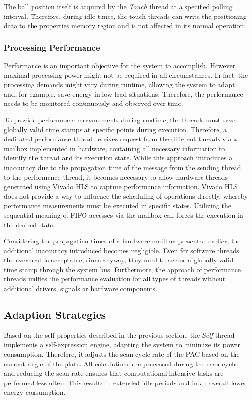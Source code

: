 The ball position itself is acquired by the \emph{Touch} thread at a specified
polling interval. Therefore, during idle times, the touch threads can write
the positioning data to the properties memory region and is not affected in
its normal operation.

\subsubsection{Processing Performance}
\label{sssec:processing}
Performance is an important objective for the system to accomplish. However,
maximal processing power might not be required in all circumstances. In fact,
the processing demands might vary during runtime, allowing the system to adapt
and, for example, save energy in low load situations. Therefore, the
performance needs to be monitored continuously and observed over time.

To provide performance measurements during runtime, the threads must save
globally valid time stamps at specific points during execution. Therefore, a
dedicated performance thread receives request from the different threads via a
mailbox implemented in hardware, containing all necessary information to
identify the thread and its execution state. While this approach introduces a
inaccuracy due to the propagation time of the message from the sending thread
to the performance thread, it becomes necessary to allow hardware threads
generated using Vivado HLS to capture performance information. Vivado HLS does
not provide a way to influence the scheduling of operations directly, whereby
performance measurements must be executed in specific states. Utilizing the
sequential meaning of \ac{FIFO} accesses via the mailbox call forces the execution in the desired state.

Considering the propagation times of a hardware mailbox presented earlier, the
additional inaccuracy introduced becomes negligible. Even for software threads
the overhead is acceptable, since anyway, they need to access a globally valid
time stamp through the system bus. Furthermore, the approach of performance
threads unifies the performance evaluation for all types of threads without
additional drivers, signals or hardware components.

\subsection{Adaption Strategies}
Based on the self-properties described in the previous section, the
\emph{Self} thread implements a self-expression engine, adapting the system to
minimize its power consumption. Therefore, it adjusts the scan cycle rate of
the \ac{PAC} based on the current angle of the plate. All calculations are
processed during the scan cycle and reducing the scan rate ensures that
computational intensive tasks are performed less often. This results in
extended idle periods and in an overall lower energy consumption.

